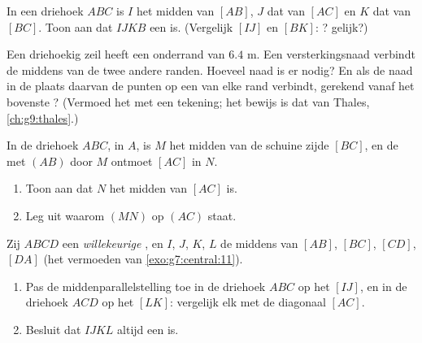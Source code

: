 \begin{exercise}[$\star\star$]\label{exo:g8:midpoints:6}
In een driehoek $ABC$ is $I$ het midden van $[AB]$, $J$ dat van $[AC]$ en $K$ dat
van $[BC]$. Toon aan dat $IJKB$ een  is. (Vergelijk $[IJ]$ en
$[BK]$: ? gelijk?)
\end{exercise}

\begin{exercise}[$\star\star$]\label{exo:g8:midpoints:7}
Een driehoekig zeil heeft een onderrand van $6.4$ m. Een versterkingsnaad
verbindt de middens van de twee andere randen. Hoeveel naad is er nodig? En als
de naad in de plaats daarvan de punten op een  van elke rand verbindt,
gerekend vanaf het bovenste ? (Vermoed het met een tekening; het bewijs
is dat van Thales, \cref{ch:g9:thales}.)
\end{exercise}

\begin{exercise}[$\star\star$]\label{exo:g8:midpoints:8}
In de driehoek $ABC$,  in $A$, is $M$ het midden van de schuine zijde
$[BC]$, en de  met $(AB)$ door $M$ ontmoet $[AC]$ in $N$.
\begin{enumerate}
  \item Toon aan dat $N$ het midden van $[AC]$ is.
  \item Leg uit waarom $(MN)$  op $(AC)$ staat.
\end{enumerate}
\end{exercise}

\begin{exercise}[$\star\star\star$]\label{exo:g8:midpoints:9}
Zij $ABCD$ een \emph{willekeurige} , en $I$, $J$, $K$, $L$ de middens van
$[AB]$, $[BC]$, $[CD]$, $[DA]$ (het vermoeden van \cref{exo:g7:central:11}).
\begin{enumerate}
  \item Pas de middenparallelstelling toe in de driehoek $ABC$ op het 
        $[IJ]$, en in de driehoek $ACD$ op het  $[LK]$: vergelijk elk met
        de diagonaal $[AC]$.
  \item Besluit dat $IJKL$ altijd een  is.
\end{enumerate}
\end{exercise}

